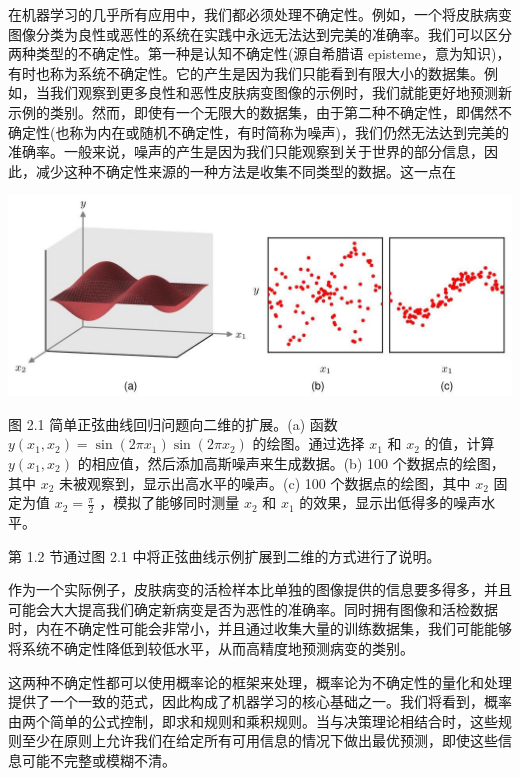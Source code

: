 \documentclass[10pt]{report}
\begin{document}
在机器学习的几乎所有应用中，我们都必须处理不确定性。例如，一个将皮肤病变图像分类为良性或恶性的系统在实践中永远无法达到完美的准确率。我们可以区分两种类型的不确定性。第一种是认知不确定性(源自希腊语 episteme，意为知识)，有时也称为系统不确定性。它的产生是因为我们只能看到有限大小的数据集。例如，当我们观察到更多良性和恶性皮肤病变图像的示例时，我们就能更好地预测新示例的类别。然而，即使有一个无限大的数据集，由于第二种不确定性，即偶然不确定性(也称为内在或随机不确定性，有时简称为噪声)，我们仍然无法达到完美的准确率。一般来说，噪声的产生是因为我们只能观察到关于世界的部分信息，因此，减少这种不确定性来源的一种方法是收集不同类型的数据。这一点在

\begin{center}
\includegraphics[max width=1.0\textwidth]{images/0194e279-9b28-703a-88f4-c3ac21e2010d_43_240_345_1276_509_0.jpg}
\end{center}
\hspace*{3em} 

图 2.1 简单正弦曲线回归问题向二维的扩展。(a) 函数 \(y\left( {{x}_{1},{x}_{2}}\right)  = \sin \left( {{2\pi }{x}_{1}}\right) \sin \left( {{2\pi }{x}_{2}}\right)\) 的绘图。通过选择 \({x}_{1}\) 和 \({x}_{2}\) 的值，计算 \(y\left( {{x}_{1},{x}_{2}}\right)\) 的相应值，然后添加高斯噪声来生成数据。(b) 100 个数据点的绘图，其中 \({x}_{2}\) 未被观察到，显示出高水平的噪声。(c) 100 个数据点的绘图，其中 \({x}_{2}\) 固定为值 \({x}_{2} = \frac{\pi }{2}\) ，模拟了能够同时测量 \({x}_{2}\) 和 \({x}_{1}\) 的效果，显示出低得多的噪声水平。

第 1.2 节通过图 2.1 中将正弦曲线示例扩展到二维的方式进行了说明。

作为一个实际例子，皮肤病变的活检样本比单独的图像提供的信息要多得多，并且可能会大大提高我们确定新病变是否为恶性的准确率。同时拥有图像和活检数据时，内在不确定性可能会非常小，并且通过收集大量的训练数据集，我们可能能够将系统不确定性降低到较低水平，从而高精度地预测病变的类别。

这两种不确定性都可以使用概率论的框架来处理，概率论为不确定性的量化和处理提供了一个一致的范式，因此构成了机器学习的核心基础之一。我们将看到，概率由两个简单的公式控制，即求和规则和乘积规则。当与决策理论相结合时，这些规则至少在原则上允许我们在给定所有可用信息的情况下做出最优预测，即使这些信息可能不完整或模糊不清。
\end{document}
